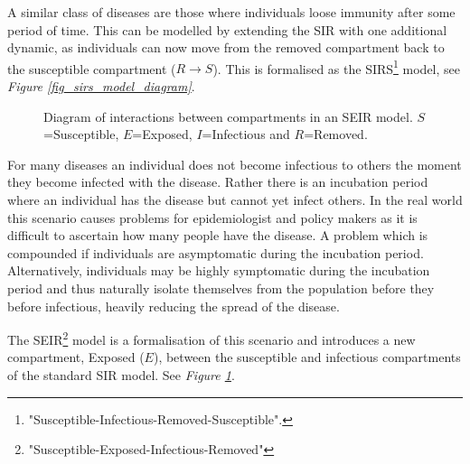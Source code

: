\documentclass[11pt,a4paper]{article}
\theoremstyle{break}
\begin{document}
  \par A similar class of diseases are those where individuals loose immunity after some period of time. This can be modelled by extending the SIR with one additional dynamic, as individuals can now move from the removed compartment back to the susceptible compartment ($R\to S$). This is formalised as the SIRS\footnote{"Susceptible-Infectious-Removed-Susceptible".} model, see \textit{Figure \ref{fig_sirs_model_diagram}}.

  \begin{figure}[H]
    \centering
    \caption{Diagram of interactions between compartments in an SEIR model. $S$=Susceptible, $E$=Exposed, $I$=Infectious and $R$=Removed.}
    \label{fig_seir_model_diagram}
  \end{figure}

  \par For many diseases an individual does not become infectious to others the moment they become infected with the disease. Rather there is an incubation period where an individual has the disease but cannot yet infect others. In the real world this scenario causes problems for epidemiologist and policy makers as it is difficult to ascertain how many people have the disease. A problem which is compounded if individuals are asymptomatic during the incubation period. Alternatively, individuals may be highly symptomatic during the incubation period and thus naturally isolate themselves from the population before they before infectious, heavily reducing the spread of the disease.

  \par The SEIR\footnote{"Susceptible-Exposed-Infectious-Removed"} model is a formalisation of this scenario and introduces a new compartment, Exposed ($E$), between the susceptible and infectious compartments of the standard SIR model. See \textit{Figure \ref{fig_seir_model_diagram}}.

\end{document}
